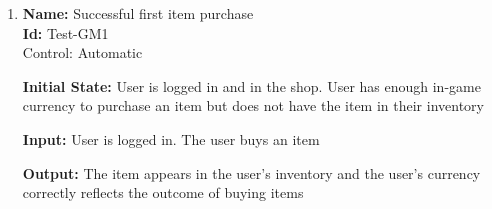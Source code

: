 \documentclass[12pt, titlepage]{article}
\begin{document}
\begin{enumerate}




					
					
					



					
					
					





\item {\textbf{Name:} Successful first item purchase\\} %
\textbf{Id:} Test-GM1 \label{Test-GM1}\\

Control: Automatic

\textbf{Initial State:} User is logged in and in the shop. User has enough in-game currency to purchase an item but does not have the item in their inventory

\textbf{Input:} User is logged in. The user buys an item

\textbf{Output:} The item appears in the user's inventory and the user's currency correctly reflects the outcome of buying items


\end{enumerate}
\end{document}

